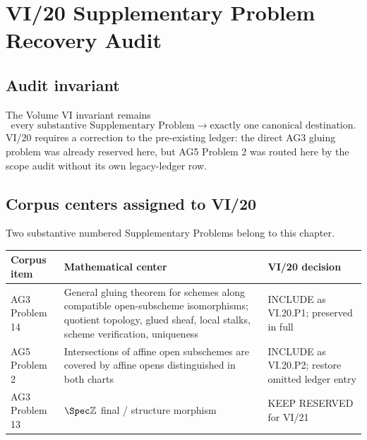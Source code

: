 \chapter*{VI/20 Supplementary Problem Recovery Audit}

\section*{Audit invariant}
The Volume VI invariant remains
\[
\boxed{\text{every substantive Supplementary Problem}\longrightarrow\text{exactly one canonical destination}.}
\]
VI/20 requires a correction to the pre-existing ledger: the direct AG3 gluing problem was already reserved here, but AG5 Problem 2 was routed here by the scope audit without its own legacy-ledger row.

\section*{Corpus centers assigned to VI/20}
Two substantive numbered Supplementary Problems belong to this chapter.
\begin{center}
\begin{tabular}{>{\raggedright\arraybackslash}p{}>{\raggedright\arraybackslash}p{}>{\raggedright\arraybackslash}p{}}
\toprule
Corpus item & Mathematical center & VI/20 decision\\
\midrule
AG3 Problem 14 & General gluing theorem for schemes along compatible open-subscheme isomorphisms; quotient topology, glued sheaf, local stalks, scheme verification, uniqueness & INCLUDE as VI.20.P1; preserved in full\\
AG5 Problem 2 & Intersections of affine open subschemes are covered by affine opens distinguished in both charts & INCLUDE as VI.20.P2; restore omitted ledger entry\\
AG3 Problem 13 & $\Spec\mathbb Z$ final / structure morphism & KEEP RESERVED for VI/21\\
\bottomrule
\end{tabular}
\end{center}

